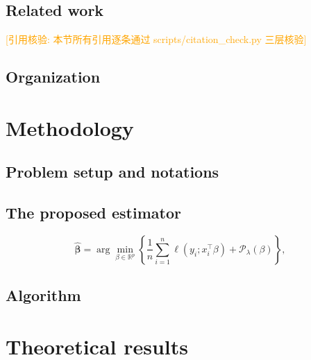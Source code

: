 \documentclass[11pt]{article}
\newcommand{\X}{\bm{X}}
\newcommand{\y}{\bm{y}}
\newcommand{\betaHat}{\hat{\bm{\beta}}}
\newcommand{\REFCHECK}[1]{\textcolor{orange}{[引用核验: #1]}} %
\begin{document}
\subsection{Related work}\label{sec:related}
\REFCHECK{本节所有引用逐条通过 scripts/citation_check.py 三层核验}

\subsection{Organization}\label{sec:org}

\section{Methodology}\label{sec:method}
\subsection{Problem setup and notations}\label{sec:setup}

\subsection{The proposed estimator}\label{sec:estimator}
\begin{equation}\label{eq:obj}
  \betaHat = \arg\min_{\beta\in\mathbb{R}^p}
  \left\{ \frac{1}{n}\sum_{i=1}^n \ell(y_i; x_i^\top\beta)
  + \mathcal{P}_\lambda(\beta) \right\},
\end{equation}

\subsection{Algorithm}\label{sec:algorithm}

\section{Theoretical results}\label{sec:theory}
\end{document}
